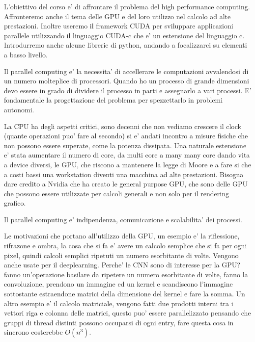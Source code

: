 L'obiettivo del corso e' di affrontare il problema del high performance computing.
Affronteremo anche il tema delle GPU e del loro utilizzo nel calcolo ad alte prestazioni. Inoltre useremo il framework CUDA per sviluppare applicazioni parallele utilizzando il linguaggio CUDA-c che e' un estensione del linguaggio c.
Introdurremo anche alcune librerie di python, andando a focalizzarci su elementi a basso livello.

Il parallel computing e' la necessita' di accellerare le computazioni avvalendosi di un numero molteplice di processori. Quando ho un processo di grande dimensioni devo essere in grado di dividere il processo in parti e assegnarlo a vari processi. E' fondamentale la progettazione del problema per spezzettarlo in problemi autonomi.

La CPU ha degli aspetti critici, sono decenni che non vediamo crescere il clock (quante operazioni puo' fare al secondo) si e' andati incontro a misure fisiche che non possono essere superate, come la potenza dissipata.
Una naturale estensione e' stata aumentare il numero di core, da multi core a many many core dando vita a device diversi, le GPU, che riscono a mantenere la legge di Moore e a fare si che a costi bassi una workstation diventi una macchina ad alte prestazioni. Bisogna dare credito a Nvidia che ha creato le general purpose GPU, che sono delle GPU che possono essere utilizzate per calcoli generali e non solo per il rendering grafico.

Il parallel computing e' indipendenza, comunicazione e scalabilita' dei processi.

Le motivazioni che portano all'utilizzo della GPU, un esempio e' la riflessione, rifrazone e ombra, la cosa che si fa e' avere un calcolo semplice che si fa per ogni pixel, quindi calcoli semplici ripetuti un numero esorbitante di volte.
Vengono anche usate per il deeplearning. Perche' le CNN sono di interesse per la GPU? fanno un'operazione basilare da ripetere un numero esorbitante di volte, fanno la convoluzione, prendono un immagine ed un kernel e scandiscono l'immagine sottostante estraendone matrici della dimensione del kernel e fare la somma.
Un altro esempio e' il calcolo matriciale, vengono fatti due prodotti interni tra i vettori riga e colonna delle matrici, questo puo' essere parallelizzato pensando che gruppi di thread distinti possono occuparsi di ogni entry, fare questa cosa in sincrono costerebbe $O(n^3)$.

